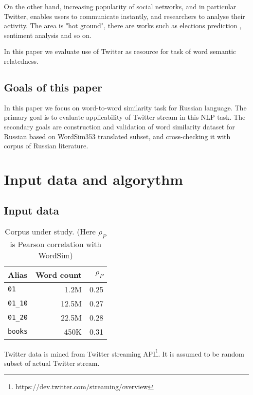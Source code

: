 \documentclass[11pt,letterpaper]{article}
\begin{document}
On the other hand, increasing popularity of social networks, and in particular Twitter,
enables users to communicate instantly, and researchers to analyse their activity.
The area is "hot ground", there are works such as elections prediction \cite{metaxas2011not}, sentiment
analysis and so on.

In this paper we evaluate use of Twitter as resource for task of word semantic relatedness.

\subsection{Goals of this paper}

In this paper we focus on word-to-word similarity task for Russian language. The primary goal
is to evaluate applicability of Twitter stream in this NLP task. The secondary goals are
construction and validation of word similarity dataset for Russian based on WordSim353 translated 
subset, and cross-checking it with corpus of Russian literature.


\section{Input data and algorythm}

\subsection{Input data}

\begin{table}
\begin{center}
\begin{tabular}{|l|r|r|}
\hline \bf Alias & \bf Word count & \bf $\rho_P$  \\ \hline
{\tt 01} & 1.2M  & 0.25\\
{\tt 01\_10} & 12.5M & 0.27 \\
{\tt 01\_20} & 22.5M & 0.28 \\
{\tt books} & 450K & 0.31 \\
\hline
\end{tabular}
\end{center}
\caption{\label{chunk-size-table} Corpus under study. 
(Here $\rho_P$ is Pearson correlation with WordSim) }
\end{table}


Twitter data is mined from Twitter streaming API\footnote{https://dev.twitter.com/streaming/overview}. It is assumed to be random subset of actual Twitter stream.
\end{document}
